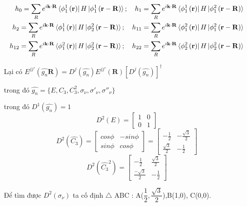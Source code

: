 \documentclass{article}
\begin{document}
\begin{align}
    h_0 = \sum_{R} e^{i\mathbf{k\cdot R}} \bra*{\phi_1^1 \left(\mathbf{r}\right)} H \ket*{\phi_1^1\left(\mathbf{r}-\mathbf{R}\right)}; \quad h_1 = \sum_{R} e^{i\mathbf{k\cdot R}} \bra*{\phi_1^1 \left(\mathbf{r}\right)} H \ket*{\phi_1^2\left(\mathbf{r}-\mathbf{R}\right)} \nonumber     \\
    h_2 = \sum_{R} e^{i\mathbf{k\cdot R}} \bra*{\phi_1^1 \left(\mathbf{r}\right)} H \ket*{\phi_2^2\left(\mathbf{r}-\mathbf{R}\right)}; \quad  h_{11} = \sum_{R} e^{i\mathbf{k\cdot R}} \bra*{\phi_1^2 \left(\mathbf{r}\right)} H \ket*{\phi_1^2\left(\mathbf{r}-\mathbf{R}\right)} \nonumber \\
    h_{12} = \sum_{R} e^{i\mathbf{k\cdot R}} \bra*{\phi_1^2 \left(\mathbf{r}\right)} H \ket*{\phi_2^2\left(\mathbf{r}-\mathbf{R}\right)}; \quad h_{22} = \sum_{R} e^{i\mathbf{k\cdot R}} \bra*{\phi_2^2 \left(\mathbf{r}\right)} H \ket*{\phi_2^2\left(\mathbf{r}-\mathbf{R}\right)} \nonumber
\end{align}



Lại có $E^{jj'} \left(\hat{g_n}\textbf{R}\right)= D^j(\hat{g_n}) E^{jj'} \left(\textbf{R}\right)\left[D^j(\hat{g_n})\right]^\dagger$


trong đó $\hat{g_n} = \{E,C_3,C^2_3,\sigma_\nu,\sigma'_\nu,\sigma''_\nu\}$


trong đó $D^1(\hat{g_n}) = 1$
\[
    \renewcommand{\arraystretch}{0.75}
    D^2(E) = \begin{bmatrix}
        1 & 0 \\
        0 & 1
    \end{bmatrix}
\]
\[
    \renewcommand{\arraystretch}{0.75}
    D^2(\hat{C_3}) = \begin{bmatrix}
        cos\phi & -sin\phi \\
        sin\phi & cos\phi
    \end{bmatrix}
    = \begin{bmatrix}
        -\frac{1}{2}       & -\frac{\sqrt{3}}{2} \\
        \frac{\sqrt{3}}{2} & -\frac{1}{2}
    \end{bmatrix}
\]
\[
    \renewcommand{\arraystretch}{0.75}
    D^2(\hat{C_3}^2) =
    \begin{bmatrix}
        -\frac{1}{2}        & \frac{\sqrt{3}}{2} \\
        \frac{-\sqrt{3}}{2} & -\frac{1}{2}
    \end{bmatrix}
\]

Để tìm được $D^2(\sigma_\nu)$ ta cố định $\bigtriangleup$ ABC : A($\dfrac{1}{2},\dfrac{\sqrt{3}}{2}$),B(1,0), C(0,0).
\end{document}
